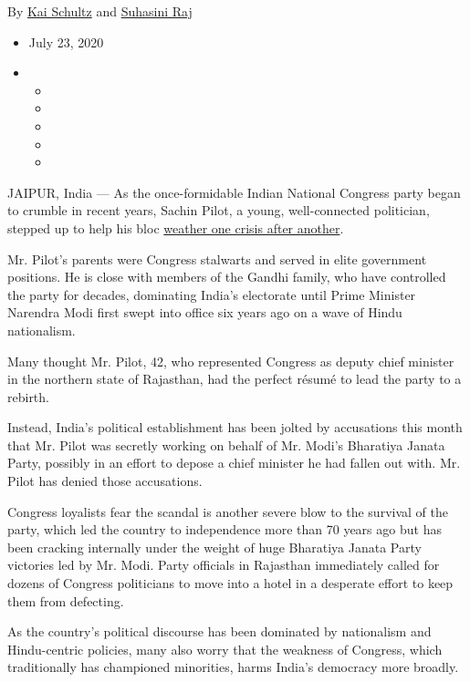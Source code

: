 By \href{https://www.nytimes.com/by/kai-schultz}{Kai Schultz} and
\href{https://www.nytimes.com/by/suhasini-raj}{Suhasini Raj}

\begin{itemize}
\item
  July 23, 2020
\item
  \begin{itemize}
  \item
  \item
  \item
  \item
  \item
  \end{itemize}
\end{itemize}

JAIPUR, India --- As the once-formidable Indian National Congress party
began to crumble in recent years, Sachin Pilot, a young, well-connected
politician, stepped up to help his bloc
\href{https://www.deccanherald.com/opinion/congress-portrait-of-a-party-in-decline-746460.html}{weather
one crisis after another}.

Mr. Pilot's parents were Congress stalwarts and served in elite
government positions. He is close with members of the Gandhi family, who
have controlled the party for decades, dominating India's electorate
until Prime Minister Narendra Modi first swept into office six years ago
on a wave of Hindu nationalism.

Many thought Mr. Pilot, 42, who represented Congress as deputy chief
minister in the northern state of Rajasthan, had the perfect résumé to
lead the party to a rebirth.

Instead, India's political establishment has been jolted by accusations
this month that Mr. Pilot was secretly working on behalf of Mr. Modi's
Bharatiya Janata Party, possibly in an effort to depose a chief minister
he had fallen out with. Mr. Pilot has denied those accusations.

Congress loyalists fear the scandal is another severe blow to the
survival of the party, which led the country to independence more than
70 years ago but has been cracking internally under the weight of huge
Bharatiya Janata Party victories led by Mr. Modi. Party officials in
Rajasthan immediately called for dozens of Congress politicians to move
into a hotel in a desperate effort to keep them from defecting.

As the country's political discourse has been dominated by nationalism
and Hindu-centric policies, many also worry that the weakness of
Congress, which traditionally has championed minorities, harms India's
democracy more broadly.

